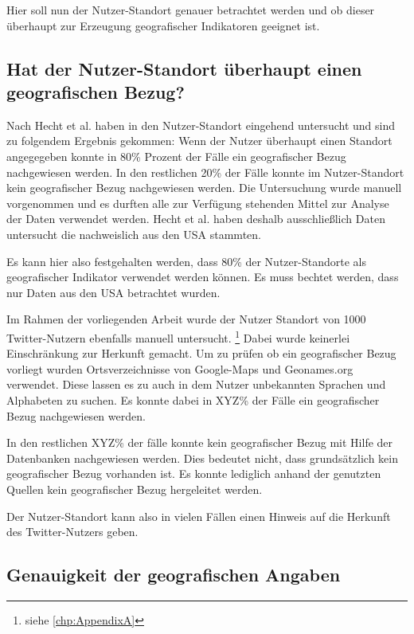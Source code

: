 		Hier soll nun der Nutzer-Standort genauer betrachtet werden und ob dieser überhaupt zur Erzeugung geografischer Indikatoren geeignet ist.

		\subsection{Hat der Nutzer-Standort überhaupt einen geografischen Bezug?} 
			
			Nach Hecht et al. haben in \cite{Hecht2011} den Nutzer-Standort eingehend untersucht und sind zu folgendem Ergebnis gekommen:
			Wenn der Nutzer überhaupt einen Standort angegegeben konnte in 80\% Prozent der Fälle ein geografischer Bezug nachgewiesen werden.
			In den restlichen 20\% der Fälle konnte im Nutzer-Standort kein geografischer Bezug nachgewiesen werden. 
			Die Untersuchung wurde manuell vorgenommen und es durften alle zur Verfügung stehenden Mittel zur Analyse der Daten verwendet werden. 
			Hecht et al. haben deshalb ausschließlich Daten untersucht die nachweislich aus den USA stammten. 

			Es kann hier also festgehalten werden, dass 80\% der Nutzer-Standorte als geografischer Indikator verwendet werden können.
			Es muss bechtet werden, dass nur Daten aus den USA betrachtet wurden.

			Im Rahmen der vorliegenden Arbeit wurde der Nutzer Standort von 1000 Twitter-Nutzern ebenfalls manuell untersucht. \footnote{siehe \ref{chp:AppendixA} }  
			Dabei wurde keinerlei Einschränkung zur Herkunft gemacht.
			Um zu prüfen ob ein geografischer Bezug vorliegt wurden Ortsverzeichnisse von Google-Maps und Geonames.org verwendet.
			Diese lassen es zu auch in dem Nutzer unbekannten Sprachen und Alphabeten zu suchen.
			Es konnte dabei in XYZ\% der Fälle ein geografischer Bezug nachgewiesen werden. 

			In den restlichen XYZ\% der fälle konnte kein geografischer Bezug mit Hilfe der Datenbanken nachgewiesen werden. 
			Dies bedeutet nicht, dass grundsätzlich kein geografischer Bezug vorhanden ist. 
			Es konnte lediglich anhand der genutzten Quellen kein geografischer Bezug hergeleitet werden.

			Der Nutzer-Standort kann also in vielen Fällen einen Hinweis auf die Herkunft des Twitter-Nutzers geben.

		\subsection{Genauigkeit der geografischen Angaben}

